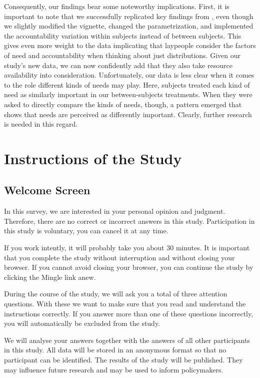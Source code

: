 \documentclass[egregdoesnotlikesansseriftitles]{scrartcl}
\begin{document}
Consequently, our findings bear some noteworthy implications.
First, it is important to note that we successfully replicated key findings from \cite{bauer_need_2022}, even though we slightly modified the vignette, changed the parametrization, and implemented the accountability variation within subjects instead of between subjects.
This gives even more weight to the data implicating that laypeople consider the factors of need and accountability when thinking about just distributions.
Given our study's new data, we can now confidently add that they also take resource availability into consideration.
Unfortunately, our data is less clear when it comes to the role different kinds of needs may play.
Here, subjects treated each kind of need as similarly important in our between-subjects treatments.
When they were asked to directly compare the kinds of needs, though, a pattern emerged that shows that needs are perceived as differently important.
Clearly, further research is needed in this regard.


\clearpage




\clearpage
\appendix
\section{Instructions of the Study}\label{sec:app_instructions}
\subsection*{Welcome Screen}
In this survey, we are interested in your personal opinion and judgment.
Therefore, there are no correct or incorrect answers in this study.
Participation in this study is voluntary, you can cancel it at any time.

If you work intently, it will probably take you about 30 minutes.
It is important that you complete the study without interruption and without closing your browser.
If you cannot avoid closing your browser, you can continue the study by clicking the Mingle link anew.

During the course of the study, we will ask you a total of three attention questions.
With these we want to make sure that you read and understand the instructions correctly.
If you answer more than one of these questions incorrectly, you will automatically be excluded from the study.

We will analyse your answers together with the answers of all other participants in this study.
All data will be stored in an anonymous format so that no participant can be identified.
The results of the study will be published.
They may influence future research and may be used to inform policymakers.
\end{document}
